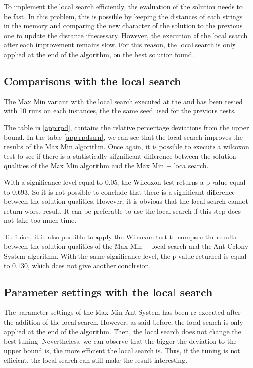\documentclass{article}
\begin{document}
To implement the local search efficiently, the evaluation of the solution needs to be fast.
In this problem, this is possible by keeping the distances of each strings in the memory and comparing the new character of the solution to the previous one to update the distance ifnecessary.
However, the execution of the local search after each improvement remains slow.
For this reason, the local search is only applied at the end of the algorithm, on the best solution found.

\subsection{Comparisons with the local search}

The Max Min variant with the local search executed at the and has been tested with 10 runs on each instances, the the same seed used for the previous tests. \newline

The table in \ref{app:rpd}, contains the relative percentage deviations from the upper bound.
In the table \ref{app:rpdsum}, we can see that the local search improves the results of the Max Min algorithm.
Once again, it is possible to execute a wilcoxon test to see if there is a statistically sifgnificant difference between the solution qualities of the Max Min algorithm and the Max Min + loca search. \newline

With a significance level equal to 0.05, the Wilcoxon test returns a p-value equal to 0.693.
So it is not possible to conclude that there is a significant difference between the solution qualities.
However, it is obvious that the local search cannot return worst result.
It can be preferable to use the local search if this step does not take too much time. \newline

To finish, it is also possible to apply the Wilcoxon test to compare the results between the solution qualities of the Max Min + local search and the Ant Colony System algorithm.
With the same significance level, the p-value returned is equal to 0.130, which does not give another conclusion.

\subsection{Parameter settings with the local search}

The parameter settings of the Max Min Ant System has been re-executed after the addition of the local search.
However, as said before, the local search is only applied at the end of the algorithm.
Then, the local search does not change the best tuning.
Nevertheless, we can observe that the bigger the deviation to the upper bound is, the more efficient the local search is.
Thus, if the tuning is not efficient, the local search can still make the result interesting.
\end{document}

